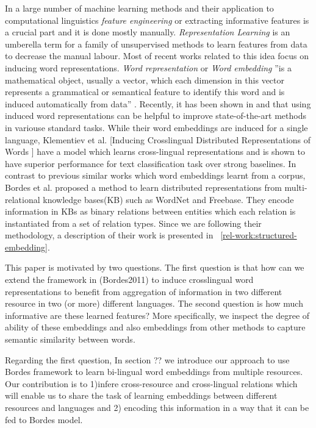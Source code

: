 \documentclass[11pt]{article}
\begin{document}
In a large number of machine learning methods and their application to computational linguistics
 \emph{feature engineering} or extracting informative features is a crucial part
 and it is done mostly manually. \emph{ Representation Learning} is an umberella term
for a family of unsupervised methods to learn features from data to decrease the manual labour. Most of recent
works related to this idea focus on inducing word
representations. \emph{Word representation} or \emph{Word embedding} ''is a mathematical object, usually a
vector, which each dimension in this vector represents a grammatical or
semantical feature to identify this word and is induced automatically from data''
\cite{Turian2010b}. Recently, it has been shown in \cite{Turian2010b} and \cite{Collobert2011} that using
 induced word representations can be helpful to improve state-of-the-art methods in 
variouse standard tasks. While their word embeddings are induced for a single
language, Klementiev et al.
[Inducing Crosslingual Distributed Representations of Words ] have a model which
learns cross-lingual representations and is shown to have superior performance
for text classification task over strong baselines. In contrast to previous similar works which word
embeddings learnt from a corpus, Bordes et al. proposed a method
\cite{Bordes2011} to learn distributed representations from multi-relational knowledge bases(KB) such as WordNet 
and Freebase. 
They encode information in KBs as binary relations between entities which each relation
 is instantiated from a set of relation types. Since we are following their methodology, 
 a description of their work is presented in ~\ref{rel-work:structured-embedding}.
 
 This paper is motivated by two questions. The first question is that how can we extend the framework in (Bordes2011)
  to induce crosslingual word representations to benefit from aggregation of information in two 
  different resource in two (or more) different languages.
  The second question is how much informative are these learned features? More specifically, we inspect the degree of ability of 
  these embeddings and also embeddings from other methods to capture semantic similarity between words.
 
 Regarding the first question, In section ?? we introduce our approach to use Bordes framework to learn
 bi-lingual word embeddings from multiple resources. Our contribution is to
 1)infere cross-resource and cross-lingual relations which will enable us to
 share the task of learning embeddings between different resources and languages and 2) encoding this
 information in a way that it can be fed to Bordes model.
 
\end{document}
